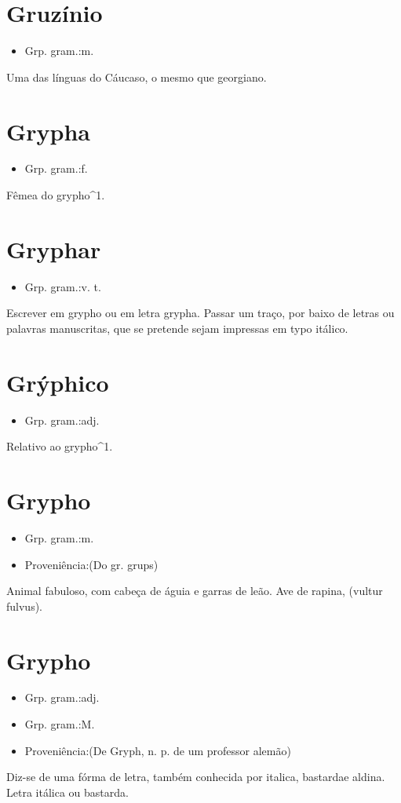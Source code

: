 \section{Gruzínio}
\begin{itemize}
\item {Grp. gram.:m.}
\end{itemize}
Uma das línguas do Cáucaso, o mesmo que \textunderscore georgiano\textunderscore .
\section{Grypha}
\begin{itemize}
\item {Grp. gram.:f.}
\end{itemize}
Fêmea do grypho^1.
\section{Gryphar}
\begin{itemize}
\item {Grp. gram.:v. t.}
\end{itemize}
Escrever em grypho ou em letra grypha.
Passar um traço, por baixo de letras ou palavras manuscritas, que se pretende sejam impressas em typo itálico.
\section{Grýphico}
\begin{itemize}
\item {Grp. gram.:adj.}
\end{itemize}
Relativo ao grypho^1.
\section{Grypho}
\begin{itemize}
\item {Grp. gram.:m.}
\end{itemize}
\begin{itemize}
\item {Proveniência:(Do gr. \textunderscore grups\textunderscore )}
\end{itemize}
Animal fabuloso, com cabeça de águia e garras de leão.
Ave de rapina, (\textunderscore vultur fulvus\textunderscore ).
\section{Grypho}
\begin{itemize}
\item {Grp. gram.:adj.}
\end{itemize}
\begin{itemize}
\item {Grp. gram.:M.}
\end{itemize}
\begin{itemize}
\item {Proveniência:(De \textunderscore Gryph\textunderscore , n. p. de um professor alemão)}
\end{itemize}
Diz-se de uma fórma de letra, também conhecida por \textunderscore italica\textunderscore , \textunderscore bastarda\textunderscore  e \textunderscore aldina\textunderscore .
Letra itálica ou bastarda.
